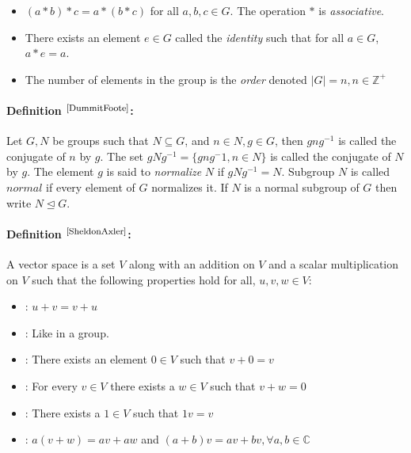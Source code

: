 \documentclass{article}
\begin{document}
\begin{itemize}
    \item[\textbf{(1)}] $(a \ast b) \ast c = a \ast (b \ast c)$ for all $a, b, c \in G$. The operation $\ast$ is \textit{associative}.
    \item[\textbf{(2)}] There exists an element $e \in G$ called the \textit{identity} such that for all $a \in G$, $a \ast e = a$.
    \item[\textbf{(3)}] The number of elements in the group is the \textit{order} denoted $\mid G \mid = n, n\in\mathbb{Z}^{+}$
\end{itemize}

\paragraph{Definition $^{\textrm{\footnotesize\cite{DummitFoote}}}$:}  Let $G,N$ be groups such that $N\subseteq G$, and $n\in N, g \in G$, then $gng^{-1}$ is called the conjugate of $n$ by $g$. The set $gNg^{-1} = \lbrace gng^-1, n\in N \rbrace$ is called the conjugate of $N$ by $g$. The element $g$ is said to 
\textit{normalize} $N$ if $gNg^{-1} = N$. Subgroup $N$ is called $normal$ if every element of $G$ normalizes it. If $N$ is a normal subgroup of $G$ then write $N \trianglelefteq G$.


\paragraph{Definition $^{\textrm{\footnotesize\cite{SheldonAxler}}}$:} A vector space is a set $V$ along with an addition on $V$ and a scalar multiplication on $V$ such that the following properties hold for all, $u,v,w\in V$:
    \begin{itemize}
        \item[\textbf{Commutativity}]: $u + v = v + u$
        \item[\textbf{Associativity}]: Like in a group.
        \item[\textbf{Additive Identity}]: There exists an element $0 \in V$ such that $v + 0 = v$
        \item[\textbf{Additive Inverse}]: For every $v \in V$ there exists a $w \in V$ such that $v + w = 0$
        \item[\textbf{Multiplicative Identity}]: There exists a $1\in V$ such that $1v = v$
        \item[\textbf{Distributive Properties}]: $a(v + w) = av + aw$ and  $(a + b)v = av +bv, \forall a,b \in \mathbb{C}$
        
    \end{itemize}
\end{document}
